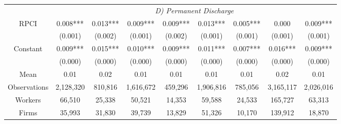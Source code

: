 \begin{tabular}{ccccccccc}
\cmidrule{2-9}      & \multicolumn{8}{c}{\textit{D) Permanent Discharge}} \\
RPCI  & 0.008*** & 0.013*** & 0.009*** & 0.009*** & 0.013*** & 0.005*** & 0.000 & 0.009*** \\
      & (0.001) & (0.002) & (0.001) & (0.002) & (0.001) & (0.001) & (0.001) & (0.001) \\
Constant & 0.009*** & 0.015*** & 0.010*** & 0.009*** & 0.011*** & 0.007*** & 0.016*** & 0.009*** \\
      & (0.000) & (0.000) & (0.000) & (0.000) & (0.000) & (0.000) & (0.000) & (0.000) \\
Mean  & 0.01  & 0.02  & 0.01  & 0.01  & 0.01  & 0.01  & 0.02  & 0.01 \\
\midrule
Observations & 2,128,320 & 810,816 & 1,616,672 & 459,296 & 1,906,816 & 785,056 & 3,165,117 & 2,026,016 \\
Workers & 66,510 & 25,338 & 50,521 & 14,353 & 59,588 & 24,533 & 165,727 & 63,313 \\
Firms & 35,993 & 31,830 & 39,739 & 13,829 & 51,326 & 10,170 & 139,912 & 18,870 \\
\bottomrule
\bottomrule
\end{tabular}%
